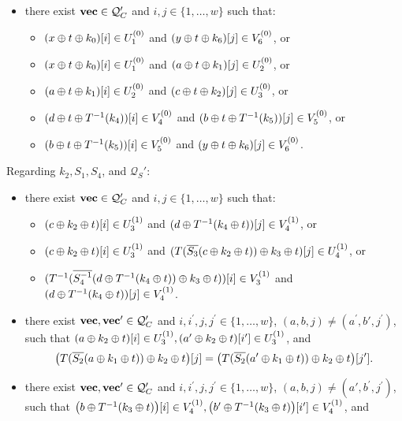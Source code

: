 \begin{definition}
\begin{itemize}[leftmargin=10mm]
\begin{itemize}
		\end{itemize}
		\item[\cthree] there exist $\mathbf{vec} \in \mathcal{Q}_{C}'$ and $i, j \in \{1, \ldots, w\}$ such that:
		\begin{itemize}
			\item $(x\oplus t\oplus k_0)[i]\in U_1^{(0)}$ and $(y\oplus t\oplus k_6)[j]\in V_6^{(0)}$, or
			\item $(x\oplus t\oplus k_0)[i]\in U_1^{(0)}$ and $(a\oplus t \oplus k_1)[j]\in U_{2}^{(0)}$, or
			\item $(a\oplus t \oplus k_1)[i]\in U_{2}^{(0)}$ and $(c\oplus t \oplus k_2)[j]\in U_{3}^{(0)}$, or
			\item $(d\oplus t\oplus T^{-1}(k_4))[i]\in V_4^{(0)}$ and
			$(b\oplus t\oplus T^{-1}(k_5))[j]\in V_5^{(0)}$, or
			\item $(b\oplus t\oplus T^{-1}(k_5))[i]\in V_5^{(0)}$ and
			$(y\oplus t\oplus k_6)[j]\in V_6^{(0)}$.
		\end{itemize}
	\end{itemize}
	Regarding $k_2,S_1,S_4$, and $\mathcal{Q}_S'$:
	\begin{itemize}[leftmargin=10mm]
		\item[\cfour] there exist $\mathbf{vec} \in \mathcal{Q}_{C}'$ and $i, j \in\{1, \ldots, w\}$ such that:
		\begin{itemize}
			\item $(c\oplus k_2\oplus t)[i]\in U_3^{(1)}$ and $(d\oplus T^{-1}(k_4\oplus t))[j]\in V_4^{(1)}$, or
			\item $(c\oplus k_2\oplus t)[i]\in U_3^{(1)}$ and $(T(\overline{S_3}(c\oplus k_2\oplus t))\oplus k_3\oplus t)[j]\in U_4^{(1)}$, or
			\item $(T^{-1}(\overline{S_4^{-1}}(d\oplus T^{-1}(k_4\oplus t))\oplus k_3\oplus t))[i]\in V_3^{(1)}$ and $(d\oplus T^{-1}(k_4\oplus t))[j]\in V_4^{(1)}$.
		\end{itemize}
		\item[\cfive] there exist $\mathbf{vec},\mathbf{vec}' \in \mathcal{Q}_{C}'$ and $i, i^{\prime},j, j^{\prime} \in\{1, \ldots, w\}$, $(a,b, j) \neq \left(a^{\prime}, b',j^{\prime}\right)$, such that $(a \oplus k_2\oplus t)[i]\in U_3^{(1)}, (a' \oplus k_2\oplus t)[i']\in U_3^{(1)}$, and
		$$\big(T(\overline{S_2}(a\oplus k_1\oplus t))\oplus k_2\oplus t\big)[j]=\big(T(\overline{S_2}(a'\oplus k_1\oplus t))\oplus k_2\oplus t\big)[j'].
		$$
		\item[\csix] there exist $\mathbf{vec},\mathbf{vec}' \in \mathcal{Q}_{C}'$ and $i, i^{\prime}, j, j^{\prime} \in\{1, \ldots, w\}$, $(a,b, j) \neq \left(a',b^{\prime}, j^{\prime}\right)$, such that $\big(b \oplus T^{-1}(k_3\oplus t)\big)[i]\in V_4^{(1)}, \big(b' \oplus T^{-1}(k_3\oplus t)\big)[i']\in V_4^{(1)}$, and         {\small
}
\end{itemize}
\end{definition}
